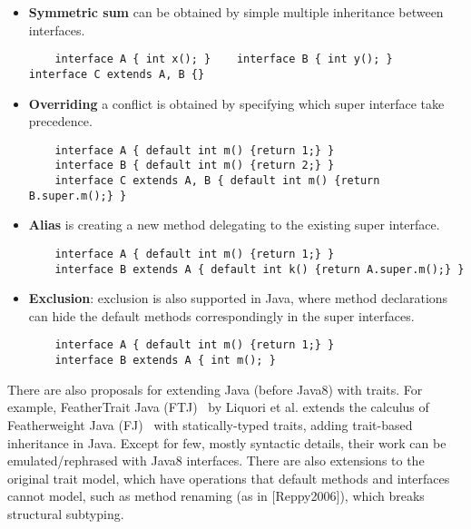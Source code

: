 \newcommand\shortItem{\vspace{-1ex}}
\begin{itemize}
\item \textbf{Symmetric sum} can be obtained by simple multiple inheritance between interfaces.
\shortItem
    \begin{lstlisting}
    interface A { int x(); }    interface B { int y(); }    interface C extends A, B {}
    \end{lstlisting}
\shortItem
\item \textbf{Overriding} a conflict is obtained by specifying which super interface take precedence.
\shortItem
    \begin{lstlisting}
    interface A { default int m() {return 1;} } 
    interface B { default int m() {return 2;} }
    interface C extends A, B { default int m() {return B.super.m();} }
    \end{lstlisting}
\shortItem
\item \textbf{Alias} is creating  a new method delegating to the existing super interface.
\shortItem
    \begin{lstlisting}
    interface A { default int m() {return 1;} }
    interface B extends A { default int k() {return A.super.m();} }
    \end{lstlisting}
\shortItem

\item \textbf{Exclusion}: exclusion is also supported in Java, where method declarations can hide the default methods correspondingly in the super interfaces.
\shortItem
    \begin{lstlisting}
    interface A { default int m() {return 1;} }
    interface B extends A { int m(); }
    \end{lstlisting}
\shortItem
\end{itemize}

There are also proposals for extending Java (before Java8) with
traits. For example, FeatherTrait Java (FTJ)~\cite{Liquori08ftj} by
Liquori et al. extends the calculus of Featherweight Java
(FJ)~\cite{Igarashi01FJ} with statically-typed traits, adding
trait-based inheritance in Java.  Except for few, mostly syntactic
details, their work can be emulated/rephrased with Java8 interfaces.
There are also extensions to the original trait model, which have operations 
that default methods and interfaces cannot model, such as method renaming
(as in [Reppy2006]), which breaks structural subtyping.


